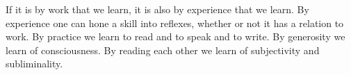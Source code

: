 

If it is by work that we learn, it is also by experience that we
learn.  By experience one can hone a skill into reflexes, whether or
not it has a relation to work.  By practice we learn to read and to
speak and to write.  By generosity we learn of consciousness.  By
reading each other we learn of subjectivity and subliminality.

\bye
